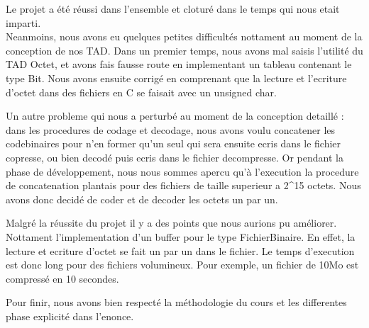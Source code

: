 Le projet a \'{e}t\'{e} réussi dans l'ensemble et cloturé dans le temps qui nous etait imparti. \\

Neanmoins, nous avons eu quelques petites difficultés nottament au moment de la conception de nos TAD. Dans un premier temps, nous avons mal saisis l'utilité du TAD Octet, et avons fais fausse route en implementant un tableau contenant le type Bit. Nous avons ensuite corrigé en comprenant que la lecture et l'ecriture d'octet dans des fichiers en C se faisait avec un unsigned char.

Un autre probleme qui nous a perturbé au moment de la conception detaillé : dans les procedures de codage et decodage, nous avons voulu concatener les codebinaires pour n'en former qu'un seul qui sera ensuite ecris dans le fichier copresse, ou bien decodé puis ecris dans le fichier decompresse. Or pendant la phase de développement, nous nous sommes apercu qu'à l'execution la procedure de concatenation plantais pour des fichiers de taille superieur a 2\^{}15 octets. Nous avons donc decidé de coder et de decoder les octets un par un.

Malgr\'{e} la r\'{e}ussite du projet il y a des points que nous aurions pu am\'{e}liorer. Nottament l'implementation d'un buffer pour le type FichierBinaire. En effet, la lecture et ecriture d'octet se fait un par un dans le fichier. Le temps d'execution est donc long pour des fichiers volumineux. Pour exemple, un fichier de 10Mo est compressé en 10 secondes.

Pour finir, nous avons bien respecté la méthodologie du cours et les differentes phase explicité dans l'enonce.
